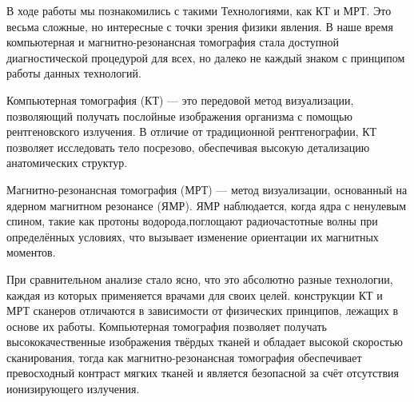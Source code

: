 В ходе работы мы познакомились с такими Технологиями, как КТ и МРТ. Это весьма сложные, но интересные с точки зрения физики явления. В наше время компьютерная и магнитно-резонансная томография стала доступной диагностической процедурой для всех, но далеко не каждый знаком с принципом работы данных технологий.

Компьютерная томография (КТ) — это передовой метод визуализации, позволяющий получать послойные изображения организма с помощью рентгеновского излучения. В отличие от традиционной рентгенографии, КТ позволяет исследовать тело посрезово, обеспечивая высокую детализацию анатомических структур. 

Магнитно-резонансная томография (МРТ) — метод визуализации, основанный на ядерном магнитном резонансе (ЯМР). ЯМР наблюдается, когда ядра с ненулевым спином, такие как протоны водорода,поглощают радиочастотные волны при определённых условиях, что вызывает изменение ориентации их магнитных моментов. 

При сравнительном анализе стало ясно, что это абсолютно разные технологии, каждая из которых применяется врачами для своих целей.  конструкции КТ и МРТ сканеров отличаются в зависимости от физических принципов, лежащих в основе их работы. Компьютерная томография позволяет получать высококачественные изображения твёрдых тканей и обладает высокой скоростью сканирования, тогда как магнитно-резонансная томография обеспечивает превосходный контраст мягких тканей и является безопасной за счёт отсутствия ионизирующего излучения.